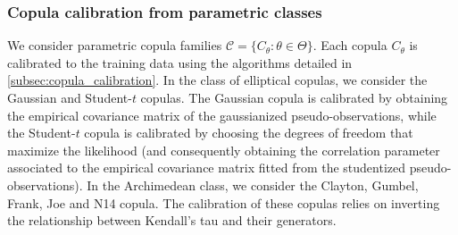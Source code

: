 \subsubsection{Copula calibration from parametric classes}

We consider parametric copula families $\mathcal{C} = \{C_\theta : \theta \in \Theta\}$. Each copula $C_{\theta}$ is calibrated to the training data using the algorithms detailed in \cref{subsec:copula_calibration}.  In the class of elliptical copulas, we consider the Gaussian and Student-$t$ copulas. The Gaussian copula is calibrated by obtaining the empirical covariance matrix of the gaussianized pseudo-observations, while the Student-$t$ copula is calibrated by choosing the degrees of freedom that maximize the likelihood (and consequently obtaining the correlation parameter associated to the empirical covariance matrix fitted from the studentized pseudo-observations). In the Archimedean class, we consider the Clayton, Gumbel, Frank, Joe and N14 copula. The calibration of these copulas relies on inverting the relationship between Kendall's tau and their generators.


